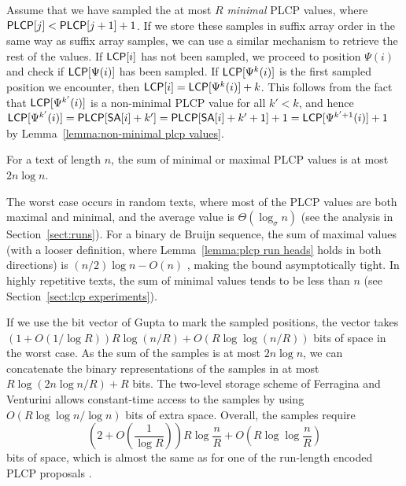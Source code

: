 Assume that we have sampled the at most $R$ \emph{minimal} PLCP values, where $\mathsf{PLCP}[j] < \mathsf{PLCP}[j+1] + 1$. If we store these samples in suffix array order in the same way as suffix array samples, we can use a similar mechanism to retrieve the rest of the values. If $\mathsf{LCP}[i]$ has not been sampled, we proceed to position $\Psi(i)$ and check if $\mathsf{LCP}[\Psi(i)]$ has been sampled. If $\mathsf{LCP}[\Psi^{k}(i)]$ is the first sampled position we encounter, then $\mathsf{LCP}[i] = \mathsf{LCP}[\Psi^{k}(i)] + k$. This follows from the fact that $\mathsf{LCP}[\Psi^{k'}(i)]$ is a non-minimal PLCP value for all $k' < k$, and hence $\mathsf{LCP}[\Psi^{k'}(i)] = \mathsf{PLCP}[\mathsf{SA}[i] + k'] = \mathsf{PLCP}[\mathsf{SA}[i] + k' + 1] + 1 = \mathsf{LCP}[\Psi^{k'+1}(i)] + 1$ by Lemma~\ref{lemma:non-minimal plcp values}.

\begin{lemma}\label{lemma:minimal plcp values}
For a text of length $n$, the sum of minimal or maximal PLCP values is at most $2n \log n$.
\end{lemma}

The worst case occurs in random texts, where most of the PLCP values are both maximal and minimal, and the average value is $\Theta(\log_{\sigma} n)$ (see the analysis in Section~\ref{sect:runs}). For a binary de Bruijn sequence, the sum of maximal values (with a looser definition, where Lemma~\ref{lemma:plcp run heads} holds in both directions) is $(n/2) \log n - O(n)$ \cite{Kaerkkaeinen2009}, making the bound asymptotically tight. In highly repetitive texts, the sum of minimal values tends to be less than $n$ (see Section~\ref{sect:lcp experiments}).

If we use the bit vector of Gupta  to mark the sampled positions, the vector takes $(1 + O(1 / \log R)) R \log (n/R) + O(R \log \log (n / R))$ bits of space in the worst case. As the sum of the samples is at most $2n \log n$, we can concatenate the binary representations of the samples in at most $R \log (2n \log n / R) + R$ bits. The two-level storage scheme of Ferragina and Venturini \cite{Ferragina2007} allows constant-time access to the samples by using $O(R \log \log n / \log n)$ bits of extra space. Overall, the samples require
$$
\left( 2 + O\left( \frac{1}{\log R} \right) \right) R \log \frac{n}{R} +
O\left( R \log \log \frac{n}{R} \right)
$$
bits of space, which is almost the same as for one of the run-length encoded PLCP proposals \cite{Maekinen2010}.


